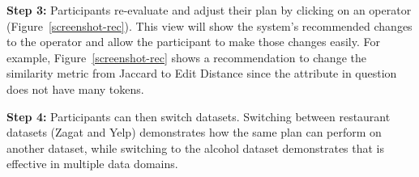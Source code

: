 \noindent\textbf{Step 3:} Participants re-evaluate and adjust their plan by clicking on an operator (Figure~\ref{screenshot-rec}).
This view will show the system's recommended changes to the operator and allow the participant to make those changes easily.
For example, Figure~\ref{screenshot-rec} shows a recommendation to change the similarity metric from Jaccard to Edit Distance since the attribute in question does not have many tokens.

\vspace{0.2em}

\noindent\textbf{Step 4: } Participants can then switch datasets. Switching between restaurant datasets (Zagat and Yelp) demonstrates how the same plan can perform on another dataset, while switching to the alcohol dataset demonstrates that \sys is effective in multiple data domains.
